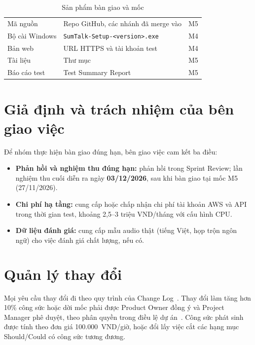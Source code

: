 \documentclass[12pt,a4paper]{report}
\begin{document}
\begin{table}[htbp]
  \centering
  \caption{Sản phẩm bàn giao và mốc}
  \label{tab:sow-deliverables}
  \begin{tabularx}{\linewidth}{@{}P{3.6cm}LQ{1.6cm}@{}}
    \toprule
     &  &  \\
    \midrule
    Mã nguồn & Repo GitHub, các nhánh đã merge vào  & M5 \\
    Bộ cài Windows & \texttt{SumTalk-Setup-<version>.exe} & M4 \\
    Bản web & URL HTTPS và tài khoản test & M4 \\
    Tài liệu & Thư mục  & M5 \\
    Báo cáo test & Test Summary Report~\cite{qtd} & M5 \\
    \bottomrule
  \end{tabularx}
\end{table}

\section{Giả định và trách nhiệm của bên giao việc}

Để nhóm thực hiện bàn giao đúng hạn, bên giao việc cam kết ba điều:
\begin{itemize}
  \item \textbf{Phản hồi và nghiệm thu đúng hạn:} phản hồi trong Sprint Review; lần nghiệm thu cuối diễn ra ngày
        \textbf{03/12/2026}, sau khi bàn giao tại mốc M5 (27/11/2026).
  \item \textbf{Chi phí hạ tầng:} cung cấp hoặc chấp nhận chi phí tài khoản AWS và API trong thời gian test, khoảng
        2,5--3 triệu VND/tháng với cấu hình CPU.
  \item \textbf{Dữ liệu đánh giá:} cung cấp mẫu audio thật (tiếng Việt, họp trộn ngôn ngữ) cho việc đánh giá chất
        lượng, nếu có.
\end{itemize}

\section{Quản lý thay đổi}

Mọi yêu cầu thay đổi đi theo quy trình của Change Log~\cite{mcr}. Thay đổi làm tăng hơn 10\% công sức hoặc dời mốc
phải được Product Owner đồng ý và Project Manager phê duyệt, theo phân quyền trong điều lệ dự án~\cite{pid}. Công
sức phát sinh được tính theo đơn giá 100.000~VND/giờ, hoặc đổi lấy việc cắt
các hạng mục Should/Could có công sức tương đương.
\end{document}

